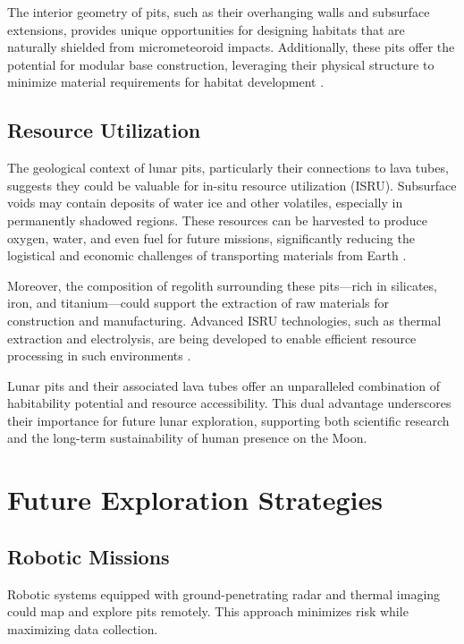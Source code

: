 \documentclass[12pt]{article}
\begin{document}
The interior geometry of pits, such as their overhanging walls and subsurface extensions, provides unique opportunities for designing habitats that are naturally shielded from micrometeoroid impacts. Additionally, these pits offer the potential for modular base construction, leveraging their physical structure to minimize material requirements for habitat development \cite{thermal-lunar-pits, lunar-base-marius-hills}.

\subsection{Resource Utilization}
The geological context of lunar pits, particularly their connections to lava tubes, suggests they could be valuable for in-situ resource utilization (ISRU). Subsurface voids may contain deposits of water ice and other volatiles, especially in permanently shadowed regions. These resources can be harvested to produce oxygen, water, and even fuel for future missions, significantly reducing the logistical and economic challenges of transporting materials from Earth \cite{Carrer2024, jsanders-isru}.

Moreover, the composition of regolith surrounding these pits—rich in silicates, iron, and titanium—could support the extraction of raw materials for construction and manufacturing. Advanced ISRU technologies, such as thermal extraction and electrolysis, are being developed to enable efficient resource processing in such environments \cite{jsanders-isru}.

Lunar pits and their associated lava tubes offer an unparalleled combination of habitability potential and resource accessibility. This dual advantage underscores their importance for future lunar exploration, supporting both scientific research and the long-term sustainability of human presence on the Moon.










\section{Future Exploration Strategies}
\subsection{Robotic Missions}
Robotic systems equipped with ground-penetrating radar and thermal imaging could map and explore pits remotely. This approach minimizes risk while maximizing data collection.
\end{document}
